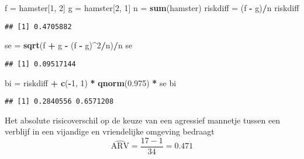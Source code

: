 \documentclass[12pt,dutch,coursenotes]{book}
\newenvironment{Shaded}{\begin{snugshade}}{\end{snugshade}}
\newcommand{\KeywordTok}[1]{\textcolor[rgb]{0.13,0.29,0.53}{\textbf{#1}}}
\newcommand{\DecValTok}[1]{\textcolor[rgb]{0.00,0.00,0.81}{#1}}
\newcommand{\FloatTok}[1]{\textcolor[rgb]{0.00,0.00,0.81}{#1}}
\newcommand{\StringTok}[1]{\textcolor[rgb]{0.31,0.60,0.02}{#1}}
\newcommand{\OperatorTok}[1]{\textcolor[rgb]{0.81,0.36,0.00}{\textbf{#1}}}
\newcommand{\NormalTok}[1]{#1}
\theoremstyle{definition}
\theoremstyle{definition}
\theoremstyle{definition}
\theoremstyle{remark}
\begin{document}
\begin{Shaded}
\begin{Highlighting}[]
\NormalTok{f =}\StringTok{ }\NormalTok{hamster[}\DecValTok{1}\NormalTok{, }\DecValTok{2}\NormalTok{]}
\NormalTok{g =}\StringTok{ }\NormalTok{hamster[}\DecValTok{2}\NormalTok{, }\DecValTok{1}\NormalTok{]}
\NormalTok{n =}\StringTok{ }\KeywordTok{sum}\NormalTok{(hamster)}
\NormalTok{riskdiff =}\StringTok{ }\NormalTok{(f }\OperatorTok{-}\StringTok{ }\NormalTok{g)}\OperatorTok{/}\NormalTok{n}
\NormalTok{riskdiff}
\end{Highlighting}
\end{Shaded}

\begin{verbatim}
## [1] 0.4705882
\end{verbatim}

\begin{Shaded}
\begin{Highlighting}[]
\NormalTok{se =}\StringTok{ }\KeywordTok{sqrt}\NormalTok{(f }\OperatorTok{+}\StringTok{ }\NormalTok{g }\OperatorTok{-}\StringTok{ }\NormalTok{(f }\OperatorTok{-}\StringTok{ }\NormalTok{g)}\OperatorTok{^}\DecValTok{2}\OperatorTok{/}\NormalTok{n)}\OperatorTok{/}\NormalTok{n}
\NormalTok{se}
\end{Highlighting}
\end{Shaded}

\begin{verbatim}
## [1] 0.09517144
\end{verbatim}

\begin{Shaded}
\begin{Highlighting}[]
\NormalTok{bi =}\StringTok{ }\NormalTok{riskdiff }\OperatorTok{+}\StringTok{ }\KeywordTok{c}\NormalTok{(}\OperatorTok{-}\DecValTok{1}\NormalTok{, }\DecValTok{1}\NormalTok{) }\OperatorTok{*}\StringTok{ }\KeywordTok{qnorm}\NormalTok{(}\FloatTok{0.975}\NormalTok{) }\OperatorTok{*}\StringTok{ }\NormalTok{se}
\NormalTok{bi}
\end{Highlighting}
\end{Shaded}

\begin{verbatim}
## [1] 0.2840556 0.6571208
\end{verbatim}

Het absolute risicoverschil op de keuze van een agressief mannetje
tussen een verblijf in een vijandige en vriendelijke omgeving bedraagt\\

\begin{equation*}
\widehat{\text{ARV}}=\frac{17-1}{34}=0.471
\end{equation*}
\end{document}
